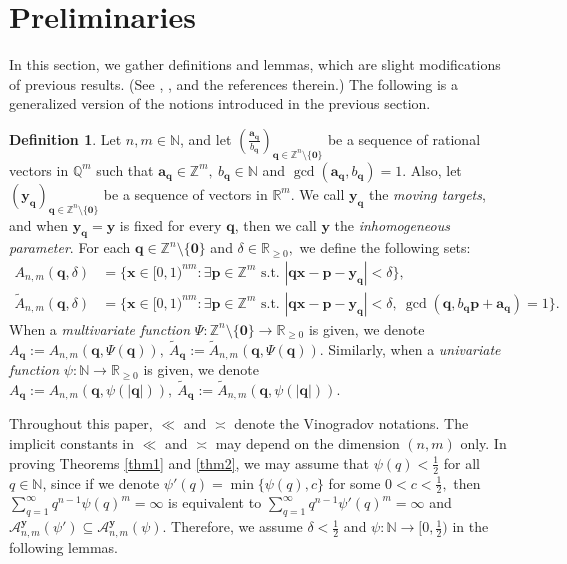 \documentclass[reqno]{amsart}
\theoremstyle{definition}
\newtheorem{definition}{Definition}
\theoremstyle{remark}
\begin{document}
\section{Preliminaries}
In this section, we gather definitions and lemmas, which are slight modifications of previous results. (See \cite{Spr79}, \cite{BV09}, \cite{AR22} and the references therein.) The following is a generalized version of the notions introduced in the previous section.
\begin{definition}\label{def}
    Let $n,m \in \mathbb{N}$, and let $(\frac{\mathbf{a}_\mathbf{q}}{b_\mathbf{q}})_{\mathbf{q} \in \mathbb{Z}^n \setminus \{\mathbf{0}\}}$ be a sequence of rational vectors in $\mathbb{Q}^m$ such that $\mathbf{a}_\mathbf{q} \in \mathbb{Z}^m,\ b_\mathbf{q} \in \mathbb{N}$ and $\gcd(\mathbf{a}_\mathbf{q}, b_\mathbf{q}) = 1.$ Also, let $(\mathbf{y}_\mathbf{q})_{\mathbf{q} \in \mathbb{Z}^n \setminus \{\mathbf{0}\}}$ be a sequence of vectors in $\mathbb{R}^m$. We call $\mathbf{y}_\mathbf{q}$ the \emph{moving targets}, and when $\mathbf{y}_\mathbf{q} = \mathbf{y}$ is fixed for every $\mathbf{q}$, then we call $\mathbf{y}$ the \emph{inhomogeneous parameter}. For each $\mathbf{q} \in \mathbb{Z}^n \setminus \{\mathbf{0}\}$ and $\delta \in \mathbb{R}_{\geq 0},$ we define the following sets:
\begin{align*}
    A_{n,m}(\mathbf{q},\delta) &= \{\mathbf{x} \in [0,1)^{nm} : \exists \mathbf{p} \in \mathbb{Z}^m \text{ s.t. } |\mathbf{qx} - \mathbf{p} - \mathbf{y}_\mathbf{q}| < \delta\}, \\
    \tilde{A}_{n,m}(\mathbf{q},\delta) &= \{\mathbf{x} \in [0,1)^{nm} : \exists \mathbf{p} \in \mathbb{Z}^m \text{ s.t. } |\mathbf{qx} - \mathbf{p} - \mathbf{y}_\mathbf{q}| <\delta, \ \gcd(\mathbf{q}, b_\mathbf{q}\mathbf{p} + \mathbf{a}_\mathbf{q}) = 1\}.
\end{align*}
    When a \emph{multivariate function} $\Psi : \mathbb{Z}^n \setminus \{\mathbf{0}\} \to \mathbb{R}_{\geq 0}$ is given, we denote $A_\mathbf{q} := A_{n,m}(\mathbf{q}, \Psi(\mathbf{q})),\ \tilde{A}_\mathbf{q} := \tilde{A}_{n,m}(\mathbf{q}, \Psi(\mathbf{q}))$. Similarly, when a \emph{univariate function} $\psi : \mathbb{N} \to \mathbb{R}_{\geq 0}$ is given, we denote $A_\mathbf{q} := A_{n,m}(\mathbf{q}, \psi(|\mathbf{q}|)),\ \tilde{A}_\mathbf{q} := \tilde{A}_{n,m}(\mathbf{q}, \psi(|\mathbf{q}|))$.
\end{definition}

Throughout this paper, $\ll$ and $\asymp$ denote the Vinogradov notations. The implicit constants in $\ll$ and $\asymp$ may depend on the dimension $(n,m)$ only. In proving Theorems \ref{thm1} and \ref{thm2}, we may assume that $\psi(q)<\frac{1}{2}$ for all $q\in \mathbb{N}$, since if we denote $\psi'(q) = \min\{\psi(q), c\}$ for some $0<c<\frac{1}{2},$ then $\sum_{q=1}^\infty q^{n-1}\psi(q)^m = \infty$ is equivalent to $\sum_{q=1}^\infty q^{n-1}\psi'(q)^m = \infty$ and $\mathscr{A}_{n,m}^\mathbf{y} (\psi') \subseteq \mathscr{A}_{n,m}^\mathbf{y} (\psi).$ Therefore, we assume $\delta< \frac{1}{2}$ and $\psi: \mathbb{N} \to [0,\frac{1}{2})$ in the following lemmas.
\end{document}
